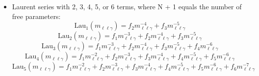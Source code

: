 \begin{itemize}
	\item Laurent series with 2, 3, 4, 5, or 6 terms, where N + 1 equals the number of free parameters:
	\begin{equation}
        \mathrm{Lau_{1}}(m_{\ell\ell\gamma}) = f_2m_{\ell\ell\gamma}^{-4}+f_3m_{\ell\ell\gamma}^{-5}
	\end{equation}
	\begin{equation}
        \mathrm{Lau_{2}}(m_{\ell\ell\gamma}) = f_1m_{\ell\ell\gamma}^{-3}+f_2m_{\ell\ell\gamma}^{-4}+f_3m_{\ell\ell\gamma}^{-5}
	\end{equation}
	\begin{equation}
        \mathrm{Lau_{3}}(m_{\ell\ell\gamma}) = f_1m_{\ell\ell\gamma}^{-3}+f_2m_{\ell\ell\gamma}^{-4}+f_3m_{\ell\ell\gamma}^{-5}+f_4m_{\ell\ell\gamma}^{-6}
	\end{equation}
	\begin{equation}
        \mathrm{Lau_{4}}(m_{\ell\ell\gamma}) = f_1m_{\ell\ell\gamma}^{-2}+f_2m_{\ell\ell\gamma}^{-3}+f_3m_{\ell\ell\gamma}^{-4}+f_4m_{\ell\ell\gamma}^{-5}+f_5m_{\ell\ell\gamma}^{-6}
	\end{equation}
	\begin{equation}
        \mathrm{Lau_{5}}(m_{\ell\ell\gamma}) = f_1m_{\ell\ell\gamma}^{-2}+f_2m_{\ell\ell\gamma}^{-3}+f_3m_{\ell\ell\gamma}^{-4}+f_4m_{\ell\ell\gamma}^{-5}+f_5m_{\ell\ell\gamma}^{-6}+f_6m_{\ell\ell\gamma}^{-7}
	\end{equation}
\end{itemize}

